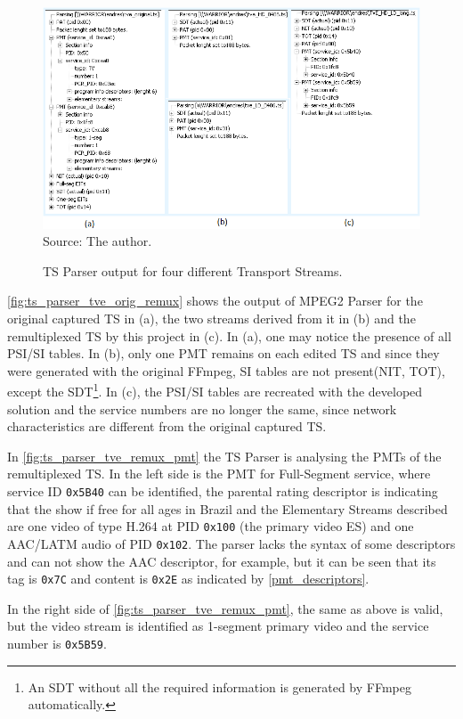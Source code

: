 \documentclass[
	12pt,				%
	openright,			%
	twoside,			%
	a4paper,			%
	brazil,
	french,				%
	english
	]{abntex2}
\begin{document}
\begin{figure}[!h]
\centering
\caption{TS Parser output for four different Transport Streams.}
\includegraphics[width=0.9\linewidth]{figuras/ts_parser_tve_orig_remux.png}
\\Source: The author.
\label{fig:ts_parser_tve_orig_remux}
\end{figure}

\autoref{fig:ts_parser_tve_orig_remux} shows the output of MPEG2 Parser for the original captured TS in (a), the two streams derived from it in (b) and the remultiplexed TS by this project in (c). In (a), one may notice the presence of all PSI/SI tables. In (b), only one PMT remains on each edited TS and since they were generated with the original FFmpeg, SI tables are not present(NIT, TOT), except the SDT\footnote{An SDT without all the required information is generated by FFmpeg automatically.}. In (c), the PSI/SI tables are recreated with the developed solution and the service numbers are no longer the same, since network characteristics are different from the original captured TS.

In \autoref{fig:ts_parser_tve_remux_pmt} the TS Parser is analysing the PMTs of the remultiplexed TS. In the left side is the PMT for Full-Segment service, where service ID \texttt{0x5B40} can be identified, the parental rating descriptor is indicating that the show if free for all ages in Brazil and the Elementary Streams described are one video of type H.264 at PID \texttt{0x100} (the primary video ES) and one AAC/LATM audio of PID \texttt{0x102}. The parser lacks the syntax of some descriptors and can not show the AAC descriptor, for example, but it can be seen that its tag is \texttt{0x7C} and content is \texttt{0x2E} as indicated by \autoref{pmt_descriptors}.

In the right side of \autoref{fig:ts_parser_tve_remux_pmt}, the same as above is valid, but the video stream is identified as 1-segment primary video and the service number is \texttt{0x5B59}.
\end{document}
